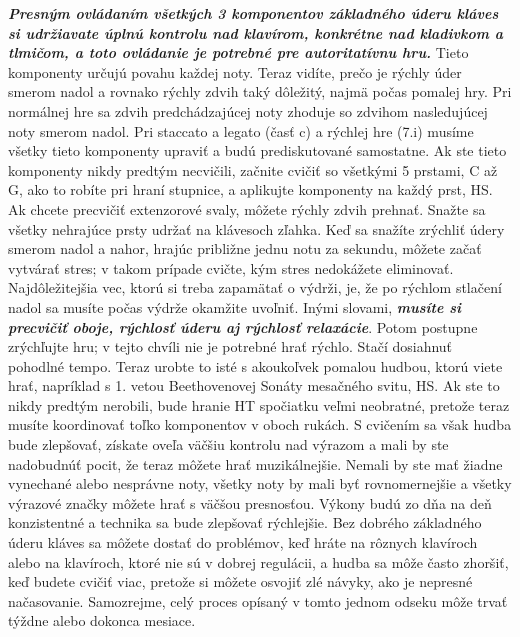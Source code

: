 \documentclass[11pt,a4paper%
]{book}
\begin{document}
\emph{\textbf{Presným ovládaním všetkých 3 komponentov základného úderu kláves si udržiavate úplnú kontrolu nad klavírom, konkrétne nad kladivkom a tlmičom, a toto ovládanie je potrebné pre autoritatívnu hru.}} Tieto komponenty určujú povahu každej noty. Teraz vidíte, prečo je rýchly úder smerom nadol a rovnako rýchly zdvih taký dôležitý, najmä počas pomalej hry. Pri normálnej hre sa zdvih predchádzajúcej noty zhoduje so zdvihom nasledujúcej noty smerom nadol. Pri staccato a legato (časť c) a rýchlej hre (7.i) musíme všetky tieto komponenty upraviť a budú prediskutované samostatne. Ak ste tieto komponenty nikdy predtým necvičili, začnite cvičiť so všetkými 5 prstami, C až G, ako to robíte pri hraní stupnice, a aplikujte komponenty na každý prst, HS. Ak chcete precvičiť extenzorové svaly, môžete rýchly zdvih prehnať. Snažte sa všetky nehrajúce prsty udržať na klávesoch zľahka. Keď sa snažíte zrýchliť údery smerom nadol a nahor, hrajúc približne jednu notu za sekundu, môžete začať vytvárať stres; v takom prípade cvičte, kým stres nedokážete eliminovať. Najdôležitejšia vec, ktorú si treba zapamätať o výdrži, je, že po rýchlom stlačení nadol sa musíte počas výdrže okamžite uvoľniť. Inými slovami, \emph{\textbf{musíte si precvičiť oboje, rýchlosť úderu aj rýchlosť relaxácie}}. Potom postupne zrýchľujte hru; v tejto chvíli nie je potrebné hrať rýchlo. Stačí dosiahnuť pohodlné tempo. Teraz urobte to isté s akoukoľvek pomalou hudbou, ktorú viete hrať, napríklad s 1. vetou Beethovenovej Sonáty mesačného svitu, HS. Ak ste to nikdy predtým nerobili, bude hranie HT spočiatku veľmi neobratné, pretože teraz musíte koordinovať toľko komponentov v oboch rukách. S cvičením sa však hudba bude zlepšovať, získate oveľa väčšiu kontrolu nad výrazom a mali by ste nadobudnúť pocit, že teraz môžete hrať muzikálnejšie. Nemali by ste mať žiadne vynechané alebo nesprávne noty, všetky noty by mali byť rovnomernejšie a všetky výrazové značky môžete hrať s väčšou presnosťou. Výkony budú zo dňa na deň konzistentné a technika sa bude zlepšovať rýchlejšie. Bez dobrého základného úderu kláves sa môžete dostať do problémov, keď hráte na rôznych klavíroch alebo na klavíroch, ktoré nie sú v dobrej regulácii, a hudba sa môže často zhoršiť, keď budete cvičiť viac, pretože si môžete osvojiť zlé návyky, ako je nepresné načasovanie. Samozrejme, celý proces opísaný v tomto jednom odseku môže trvať týždne alebo dokonca mesiace.
\end{document}
